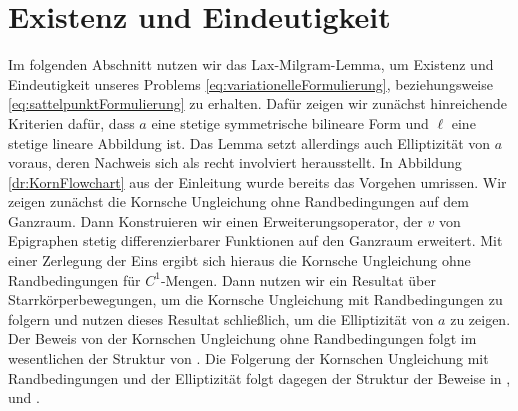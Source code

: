 \documentclass{scrartcl}
\begin{document}
\section{Existenz und Eindeutigkeit}

Im folgenden Abschnitt nutzen wir das Lax-Milgram-Lemma, um Existenz und Eindeutig\-keit unseres Problems \eqref{eq:variationelleFormulierung}, beziehungsweise \eqref{eq:sattelpunktFormulierung} zu erhalten. Dafür zeigen wir zunächst hinreichende Kriterien dafür, dass $a$ eine stetige symmetrische bilineare Form und $\ell$ eine stetige lineare Abbildung ist.
Das Lemma setzt allerdings auch Elliptizität von $a$ voraus, deren Nachweis sich als recht involviert herausstellt.
In Abbildung \ref{dr:KornFlowchart} aus der Einleitung wurde bereits das Vorgehen umrissen. 
Wir zeigen zunächst die Kornsche Ungleichung ohne Randbedingungen auf dem Ganzraum. Dann Konstruieren wir einen Erweiterungsoperator, der $v$ von Epigraphen stetig differenzierbarer Funktionen auf den Ganzraum erweitert. Mit einer Zerlegung der Eins ergibt sich hieraus die Kornsche Ungleichung ohne Randbedingungen für $C^1$-Mengen. Dann nutzen wir ein Resultat über Starrkörperbewegungen, um die Kornsche Ungleichung mit Randbedingungen zu folgern und nutzen dieses Resultat schließlich, um die Elliptizität von $a$ zu zeigen. Der Beweis von der Kornschen Ungleichung ohne Randbedingungen folgt im wesentlichen der Struktur von \cite{Nit-1981}. Die Folgerung der Kornschen Ungleichung mit Randbedingungen und der Elliptizität folgt dagegen der Struktur der Beweise in \cite{Cia-1988}, \cite{Kik-1988} und \cite{Duv-1976}.
\end{document}

